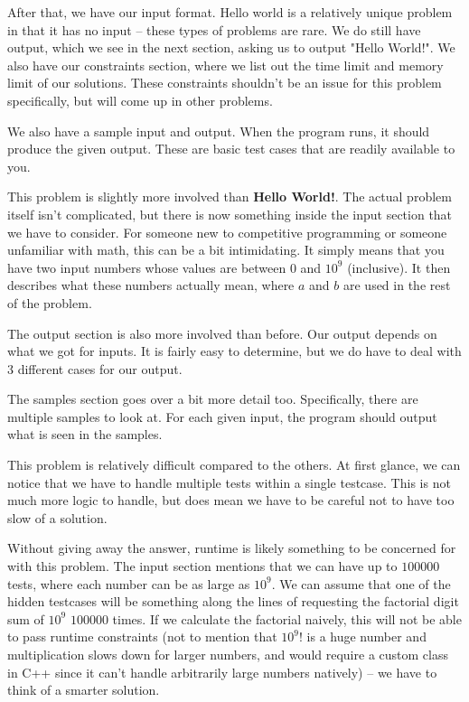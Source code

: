 After that, we have our input format. Hello world is a relatively unique problem in that it has no input -- these types of problems are rare. We do still have output, which we see in the next section, asking us to output "Hello World!". We also have our constraints section, where we list out the time limit and memory limit of our solutions. These constraints shouldn't be an issue for this problem specifically, but will come up in other problems.

We also have a sample input and output. When the program runs, it should produce the given output. These are basic test cases that are readily available to you.

\hrulefill



\hrulefill

This problem is slightly more involved than \textbf{Hello World!}. The actual problem itself isn't complicated, but there is now something inside the input section that we have to consider. For someone new to competitive programming or someone unfamiliar with math, this can be a bit intimidating. It simply means that you have two input numbers whose values are between 0 and $10^9$ (inclusive). It then describes what these numbers actually mean, where $a$ and $b$ are used in the rest of the problem.

The output section is also more involved than before. Our output depends on what we got for inputs. It is fairly easy to determine, but we do have to deal with 3 different cases for our output.

The samples section goes over a bit more detail too. Specifically, there are multiple samples to look at. For each given input, the program should output what is seen in the samples.

\hrulefill



\hrulefill

This problem is relatively difficult compared to the others. At first glance, we can notice that we have to handle multiple tests within a single testcase. This is not much more logic to handle, but does mean we have to be careful not to have too slow of a solution.

Without giving away the answer, runtime is likely something to be concerned for with this problem. The input section mentions that we can have up to $100000$ tests, where each number can be as large as $10^9$. We can assume that one of the hidden testcases will be something along the lines of requesting the factorial digit sum of $10^9$ $100000$ times. If we calculate the factorial naively, this will not be able to pass runtime constraints (not to mention that $10^9!$ is a huge number and multiplication slows down for larger numbers, and would require a custom class in C++ since it can't handle arbitrarily large numbers natively) -- we have to think of a smarter solution.

